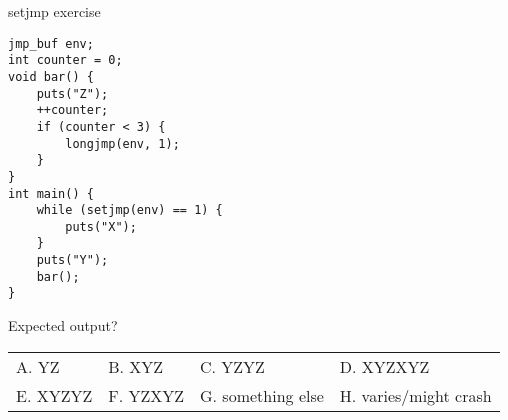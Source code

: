 \begin{frame}[fragile,label=setjmpEx]{setjmp exercise}
\lstset{language=C++,style=smaller}
\begin{lstlisting}
jmp_buf env;
int counter = 0;
void bar() {
    puts("Z");
    ++counter;
    if (counter < 3) {
        longjmp(env, 1);
    }
}
int main() {
    while (setjmp(env) == 1) {
        puts("X");
    }
    puts("Y");
    bar();
}
\end{lstlisting}
Expected output? \\
\begin{tabular}{llll}
A. YZ & B. XYZ & C. YZYZ & D. XYZXYZ \\
E. XYZYZ & F. YZXYZ & G. something else & H. varies/might crash\\
\end{tabular}
\end{frame}
